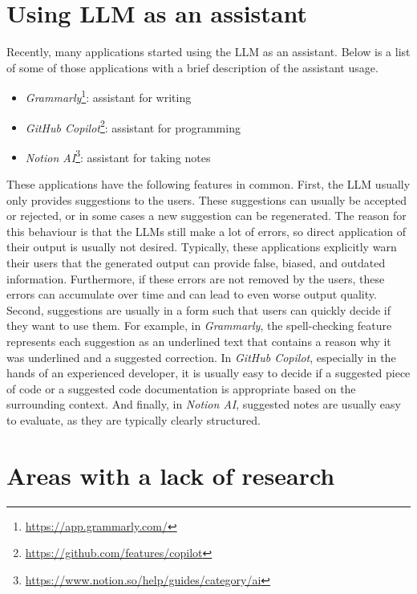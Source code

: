 \section*{Using LLM as an assistant}
\label{section:llm_as_an_assistant}

Recently, many applications started using the LLM as an assistant. Below is a list of some of those applications with a brief description of the assistant usage.

\begin{itemize}
\item \textit{Grammarly}\footnote{\url{https://app.grammarly.com/}}: assistant for writing
\item \textit{GitHub Copilot}\footnote{\url{https://github.com/features/copilot}}: assistant for programming
\item \textit{Notion AI}\footnote{\url{https://www.notion.so/help/guides/category/ai}}: assistant for taking notes
\end{itemize}

These applications have the following features in common. First, the LLM usually only provides suggestions to the users. These suggestions can usually be accepted or rejected, or in some cases a new suggestion can be regenerated. The reason for this behaviour is that the LLMs still make a lot of errors, so direct application of their output is usually not desired. Typically, these applications explicitly warn their users that the generated output can provide false, biased, and outdated information. Furthermore, if these errors are not removed by the users, these errors can accumulate over time and can lead to even worse output quality. Second, suggestions are usually in a form such that users can quickly decide if they want to use them. For example, in \textit{Grammarly}, the spell-checking feature represents each suggestion as an underlined text that contains a reason why it was underlined and a suggested correction. In \textit{GitHub Copilot}, especially in the hands of an experienced developer, it is usually easy to decide if a suggested piece of code or a suggested code documentation is appropriate based on the surrounding context. And finally, in \textit{Notion AI}, suggested notes are usually easy to evaluate, as they are typically clearly structured.


\section*{Areas with a lack of research}

